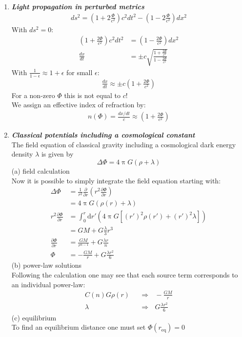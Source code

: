 \documentclass[a4paper,12pt]{article}
\newcommand{\question}[1]{\textbf{\textit{#1}}}
\renewcommand{\pi}{\uppi}
\begin{document}
\begin{enumerate}
		
		\item \question{Light propagation in perturbed metrics}\\
		\begin{align}
		ds^2=\left(1+2\frac{\Phi}{c^2}\right)c^2dt^2-\left(1-2\frac{\Phi}{c^2}\right)dx^2 
		\end{align}
		With $ds^2=0$:
		\begin{align}
		\left( 1+\frac{2\Phi}{c^2}\right)c^2dt^2 &= \left(1-\frac{2\Phi}{c^2}\right) dx^2\\
		\frac{dx}{dt}&=\pm c\sqrt{\frac{1+\frac{2\Phi}{c^2}}{1-\frac{2\Phi}{c^2}}}
		\end{align}
		With $\frac{1}{1-\epsilon}\approx 1+\epsilon$ for small $\epsilon$:
		\begin{align}
		\frac{dx}{dt}\approx\pm c\left(1+\frac{2\Phi}{c^2}\right)
		\end{align} 
		For a non-zero $\Phi$ this is not equal to $c$! \\
		We assign an effective index of refraction by:
		\begin{align}
		n(\Phi)=\frac{dx/dt}{c}\approx \left(1+\frac{2\Phi}{c^2}\right)
		\end{align}
		
		\item \question{Classical potentials including a cosmological constant}\\
		The field equation of classical gravity including a
                cosmological dark energy density $\lambda$ is given by
		\begin{equation}
		\Delta\Phi = 4\pi G(\rho + \lambda)
		\end{equation}
		(a) field calculation\\
	
		Now it is possible to simply integrate the field equation starting with:
		\begin{align}
		  \Delta\Phi&=\frac{1}{r^{2}}\frac{\partial}{\partial r}\left(r^{2}\frac{\partial\Phi}{\partial r}\right)\\
		  &=4\pi G(\rho(r)+\lambda)\\
		  r^{2}\frac{\partial\Phi}{\partial
                    r}&=\int_0^r\textrm{d}r'\left(4\pi G[\left(r'\right)^{2}\rho\left(r'\right)+\left(r'\right)^{2}\lambda]\right)\\
		  &=GM+G\frac{\lambda}{3}r^3\\
		  \frac{\partial\Phi}{\partial r}&=\frac{GM}{r^{n-1}}+G\frac{\lambda r}{n}\\
		  \Phi&=-\frac{GM}{r}+G\frac{\lambda r^2}{6}
		\end{align}
		(b) power-law solutions\\
		Following the calculation one may see that each source term corresponds to an individual power-law:
		\begin{align*}
		  C(n)G\rho(r) ~~~ &\Rightarrow ~~~ -\frac{GM}{r}\\
		  \lambda ~~~ &\Rightarrow ~~~ G\frac{\lambda r^2}{6}
		\end{align*}
		(c) equilibrium\\
		To find an equilibrium distance one must set \(\Phi\left(r_\textrm{eq}\right)=0\)
		\end{enumerate}
\end{document}
